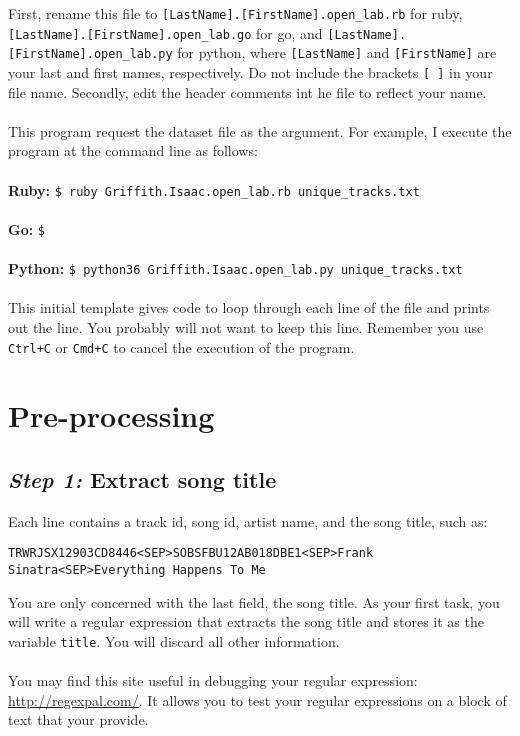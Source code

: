 \documentclass{article}
\begin{document}
\noindent First, rename this file to \verb|[LastName].[FirstName].open_lab.rb| for ruby, \verb|[LastName].[FirstName].open_lab.go| for go, and \verb|[LastName].[FirstName].open_lab.py| for python, where \verb|[LastName]| and \verb|[FirstName]| are your last and first names, respectively. Do not include the brackets \verb|[ ]| in your file name. Secondly, edit the header comments int he file to reflect your name.
\\\\
\noindent This program request the dataset file as the argument. For example, I execute the program at the command line as follows:
\\\\
\textbf{Ruby: } \verb|$ ruby Griffith.Isaac.open_lab.rb unique_tracks.txt|
\\\\
\textbf{Go: } \verb|$ |
\\\\
\textbf{Python: } \verb|$ python36 Griffith.Isaac.open_lab.py unique_tracks.txt|
\\\\
This initial template gives code to loop through each line of the file and prints out the line. You probably will not want to keep this line. Remember you use \verb|Ctrl+C| or \verb|Cmd+C| to cancel the execution of the program.

\section*{Pre-processing}

\subsection*{\textit{Step 1:} Extract song title}
Each line contains a track id, song id, artist name, and the song title, such as:
\begin{center}
 \verb|TRWRJSX12903CD8446<SEP>SOBSFBU12AB018DBE1<SEP>Frank Sinatra<SEP>Everything Happens To Me|
\end{center}

\noindent You are only concerned with the last field, the song title. As your first task, you will write a regular expression that extracts the song title and stores it as the variable \verb|title|. You will discard all other information.
\\\\
You may find this site useful in debugging your regular expression: \url{http://regexpal.com/}. It allows you to test your regular expressions on a block of text that your provide.
\end{document}
